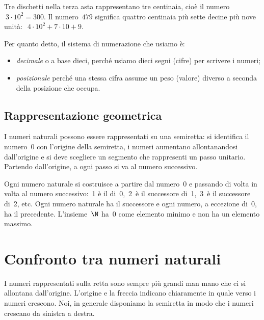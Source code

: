 Tre dischetti nella terza asta rappresentano tre centinaia, 
cioè il numero~\(~3 \cdot 10^2=300\).
Il numero~\(479\) significa quattro centinaia più sette decine più 
nove unità:~\(~4 \cdot 10^2 + 7 \cdot 10 + 9\).

Per quanto detto, il sistema di numerazione che usiamo è:

\begin{itemize} [noitemsep]
\item \emph{decimale} o a base dieci, 
perché usiamo dieci segni (cifre) per scrivere i numeri;
\item \emph{posizionale} 
perché una stessa cifra assume un peso (valore) diverso a seconda della 
posizione che occupa.
\end{itemize}

\subsection{Rappresentazione geometrica}
I numeri naturali possono essere rappresentati su una semiretta: 
si identifica il numero~0 con l'origine della semiretta, 
i numeri aumentano allontanandosi dall'origine e si deve scegliere un 
segmento che rappresenti un passo unitario.
Partendo dall'origine, a ogni passo si va al numero successivo.

{\natrappgeo}

\vspace{-.5em}
Ogni numero naturale si costruisce a partire dal numero~0 e passando di 
volta in volta al numero successivo:~1 è il  di~0,~2~è il 
successore di~1,~3~è il successore di~2, etc. 
Ogni numero naturale ha il successore e ogni numero, a eccezione 
di~0, ha il
precedente. 
L'insieme~\(\N\) ha~0 come elemento 
minimo e non ha un elemento 
massimo.


\section{Confronto tra numeri naturali}
\label{sec:nat_confronto}

I numeri rappresentati sulla retta sono sempre più grandi man mano che ci 
si allontana dall'origine. 
L'origine e la freccia indicano chiaramente in quale verso i numeri 
crescono. Noi, in generale disponiamo la semiretta in modo che i numeri 
crescano da sinistra a destra.


